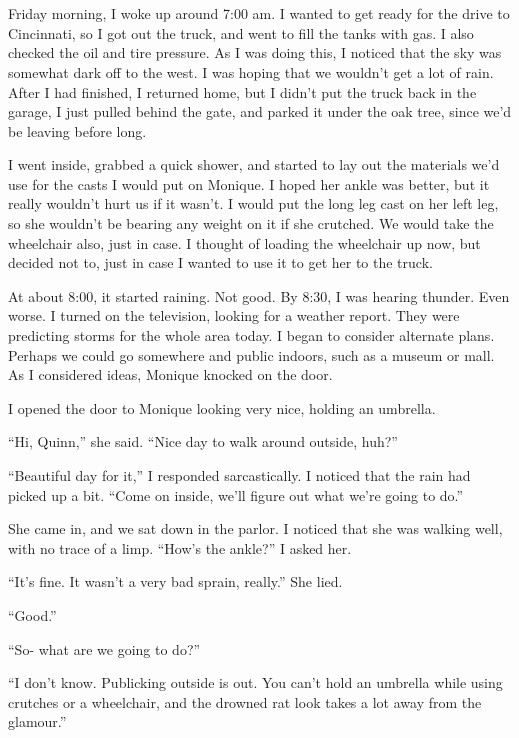 \chapter{~}
Friday morning, I woke up around 7:00 am. I wanted to get ready for the drive to Cincinnati,
so I got out the truck, and went to fill the tanks with gas. I also checked the oil and tire
pressure. As I was doing this, I noticed that the sky was somewhat dark off to the west. I was
hoping that we wouldn't get a lot of rain. After I had finished, I returned home, but I didn't
put the truck back in the garage, I just pulled behind the gate, and parked it under the oak
tree, since we'd be leaving before long.

I went inside, grabbed a quick shower, and started to lay out the materials we'd use for
the casts I would put on Monique. I hoped her ankle was better, but it really wouldn't hurt us
if it wasn't. I would put the long leg cast on her left leg, so she wouldn't be bearing any
weight on it if she crutched. We would take the wheelchair also, just in case. I thought of
loading the wheelchair up now, but decided not to, just in case I wanted to use it to get her to
the truck.

At about 8:00, it started raining. Not good. By 8:30, I was hearing thunder. Even worse. I
turned on the television, looking for a weather report. They were predicting storms for the
whole area today. I began to consider alternate plans. Perhaps we could go somewhere and public
indoors, such as a museum or mall. As I considered ideas, Monique knocked on the door.

I opened the door to Monique looking very nice, holding an umbrella.

``Hi, Quinn,'' she said. ``Nice day to walk around outside, huh?''

``Beautiful day for it,'' I responded sarcastically. I noticed that the rain had picked up
a bit. ``Come on inside, we'll figure out what we're going to do.''

She came in, and we sat down in the parlor. I noticed that she was walking well, with no
trace of a limp. ``How's the ankle?'' I asked her.

``It's fine. It wasn't a very bad sprain, really.'' She lied.

``Good.''

``So- what are we going to do?''

``I don't know. Publicking outside is out. You can't hold an umbrella while using crutches
or a wheelchair, and the drowned rat look takes a lot away from the glamour.''

